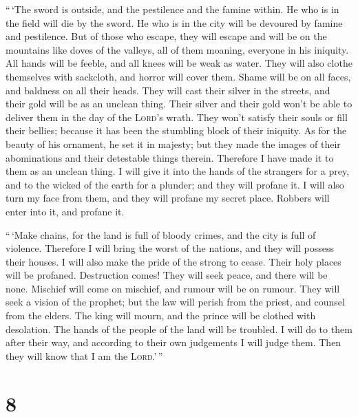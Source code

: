  ``\,`The sword is outside, and the pestilence and the
famine within. He who is in the field will die by the sword. He who is
in the city will be devoured by famine and pestilence. 
But of those who escape, they will escape and will be on the mountains
like doves of the valleys, all of them moaning, everyone in his
iniquity.  All hands will be feeble, and all knees will
be weak as water.  They will also clothe themselves with
sackcloth, and horror will cover them. Shame will be on all faces, and
baldness on all their heads.  They will cast their silver
in the streets, and their gold will be as an unclean thing. Their silver
and their gold won't be able to deliver them in the day of the
\textsc{Lord}'s wrath. They won't satisfy their souls or fill their
bellies; because it has been the stumbling block of their iniquity.
 As for the beauty of his ornament, he set it in majesty;
but they made the images of their abominations and their detestable
things therein. Therefore I have made it to them as an unclean thing.
 I will give it into the hands of the strangers for a
prey, and to the wicked of the earth for a plunder; and they will
profane it.  I will also turn my face from them, and they
will profane my secret place. Robbers will enter into it, and profane
it.

 ``\,`Make chains, for the land is full of bloody crimes,
and the city is full of violence.  Therefore I will bring
the worst of the nations, and they will possess their houses. I will
also make the pride of the strong to cease. Their holy places will be
profaned.  Destruction comes! They will seek peace, and
there will be none.  Mischief will come on mischief, and
rumour will be on rumour. They will seek a vision of the prophet; but
the law will perish from the priest, and counsel from the elders.
 The king will mourn, and the prince will be clothed with
desolation. The hands of the people of the land will be troubled. I will
do to them after their way, and according to their own judgements I will
judge them. Then they will know that I am the \textsc{Lord}.'\,''

\hypertarget{section-7}{%
\section{8}\label{section-7}}

